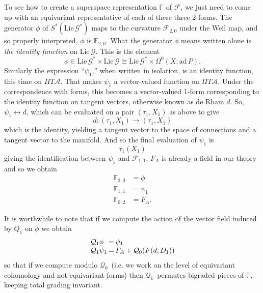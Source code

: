 \documentclass[twoside]{amsart}
\newcommand{\tighten}{\setlength{\arraycolsep}{1pt}}
\newcommand{\FF}{\ensuremath{\mathbb{F}}}
\newcommand{\enm}[1]{\ensuremath{#1}}
\renewcommand{\aa}{\enm{\mathcal{A}}}
\renewcommand{\gg}{\enm{\mathcal{G}}}
\newcommand{\ad}{\enm{\mathrm{ad}}}
\newcommand{\formsij}[2]{\ensuremath{\Omega^{#1}({#2})}}
\newcommand{\qoc}{\enm{\mathcal{Q}_{1}}}
\newcommand{\qzc}{\enm{\mathcal{Q}_{0}}}
\newcommand{\ff}{\enm{\mathcal{F}}}
\newcommand{\adp}{\enm{\ad\,P}}
\newcommand{\lieg}{\enm{\mathrm{Lie}\,\gg}}
\begin{document}
To see how to create a superspace representation \( \FF \) of \ff, we
just need to come up with an equivariant representative of each of
these three 2-forms.  The generator \( \phi \) of \( S^{*}(\lieg^{*})
\) maps to the curvature \( \ff_{2,0} \) under the Weil map, and so
properly interpreted, \( \phi \) is \( \FF_{2,0} \).  What the
generator \( \phi \) means written alone is \emph{the identity
function} on \lieg.  This is the element
\[ \phi\in\lieg^{*}\times\lieg\cong \lieg^{*}\times \formsij{0}{X;
\adp}.  \]
Similarly the expression ``\( \psi_{1} \),'' when written in
isolation, is an identity function, this time on \( \Pi T\aa \).
That makes \( \psi_{1} \) a vector-valued function on \( \Pi T\aa. \)
Under the correspondence with forms, this becomes a vector-valued
1-form corresponding to the identity function on tangent vectors,
otherwise known as de Rham \( d \).  So, \( \psi_{1}\leftrightarrow d
\), which can be evaluated on a pair \( (\tau_{1}, X_{1}) \) as above
to give
\[ d:(\tau_{1}, X_{1})\to (\tau_{1}, X_{1}) \]
which is the identity, yielding a tangent vector to the space of
connections and a tangent vector to the manifold.  And so the final
evaluation of \( \psi_{1} \) is
\[ \tau_{1}(X_{1}) \]
giving the identification between \( \psi_{1} \) and \( \ff_{1,1}
\).  \( F_{A} \)
is already a field in our theory and so we obtain
\begin{align}
    \FF_{2,0} &= \phi\\
    \FF_{1,1} &= \psi_{1} \\
    \FF_{0,2} &= F_{A}.
\end{align}

It is worthwhile to note that if we compute the action of the vector
field induced by \( Q_{1} \) on \( \phi \) we obtain
\begin{equation}
\tighten{
\begin{array}{lcl}
    \qoc\phi &=& \psi_{1} \\
    \qoc\psi_{1} &=& F_{A} + \qzc(F(d,D_{1}))
\end{array}}
\end{equation}
so that if we compute modulo \qzc\ (i.e. we work on the level of
equivariant cohomology and not equivariant forms) then \qoc\
permutes bigraded pieces of \FF, keeping total grading invariant.
\end{document}
